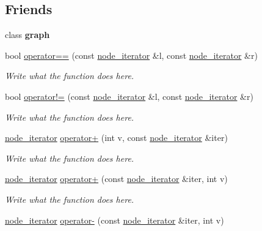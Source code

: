 \subsection*{Friends}
\begin{DoxyCompactItemize}
\item 
\hypertarget{classgraph_1_1node__iterator_ab8b0dbc1b36724e5e4635ac651c218cb}{class {\bfseries graph}}\label{classgraph_1_1node__iterator_ab8b0dbc1b36724e5e4635ac651c218cb}

\item 
bool \hyperlink{classgraph_1_1node__iterator_a8a4971ebadf282168d84a07d4914c93c}{operator==} (const \hyperlink{classgraph_1_1node__iterator}{node\+\_\+iterator} \&l, const \hyperlink{classgraph_1_1node__iterator}{node\+\_\+iterator} \&r)
\begin{DoxyCompactList}\small\item\em Write what the function does here. \end{DoxyCompactList}\item 
bool \hyperlink{classgraph_1_1node__iterator_ad75d23092c9ff953c3738f3454ccd9fb}{operator!=} (const \hyperlink{classgraph_1_1node__iterator}{node\+\_\+iterator} \&l, const \hyperlink{classgraph_1_1node__iterator}{node\+\_\+iterator} \&r)
\begin{DoxyCompactList}\small\item\em Write what the function does here. \end{DoxyCompactList}\item 
\hyperlink{classgraph_1_1node__iterator}{node\+\_\+iterator} \hyperlink{classgraph_1_1node__iterator_a6b1761a28d4367ba919c85f9f2c8d0e4}{operator+} (int v, const \hyperlink{classgraph_1_1node__iterator}{node\+\_\+iterator} \&iter)
\begin{DoxyCompactList}\small\item\em Write what the function does here. \end{DoxyCompactList}\item 
\hyperlink{classgraph_1_1node__iterator}{node\+\_\+iterator} \hyperlink{classgraph_1_1node__iterator_a08e8068052fc1729d5b6a350e9dd1346}{operator+} (const \hyperlink{classgraph_1_1node__iterator}{node\+\_\+iterator} \&iter, int v)
\begin{DoxyCompactList}\small\item\em Write what the function does here. \end{DoxyCompactList}\item 
\hyperlink{classgraph_1_1node__iterator}{node\+\_\+iterator} \hyperlink{classgraph_1_1node__iterator_a0ac6efe2377fcbb51fe24924ce89608d}{operator-\/} (const \hyperlink{classgraph_1_1node__iterator}{node\+\_\+iterator} \&iter, int v)

\end{DoxyCompactItemize}
